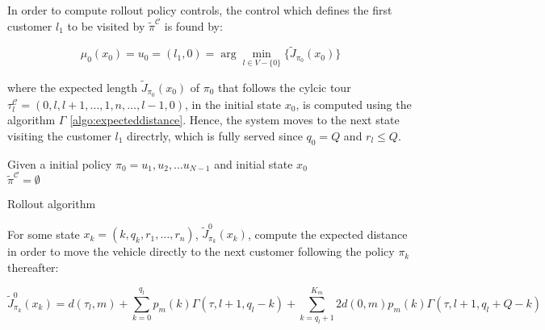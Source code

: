 

In order to compute rollout policy controls, the control which defines the first customer $l_1$ to be visited by $\tilde{\pi}^\mathcal{C}$ is found by:

\[\mu_0(x_0) = u_0 = (l_1,0) = \arg\min\limits_{l \in V-\{0\}} \{\tilde{J}_{\pi_0}(x_0)\}\]

where the expected length $\tilde{J}_{\pi_0}(x_0)$ of ${\pi_0}$ that follows the cylcic tour $\tau^\mathcal{C}_l=(0,l,l+1,\ldots,1,n,\ldots,l-1,0)$, in the initial state $x_0$, is computed using the algorithm $\Gamma$ \ref{algo:expecteddistance}. Hence, the system moves to the next state visiting the customer $l_1$ directrly, which is fully served since $q_0 = Q$ and $r_l \leq Q$.


 
\begin{algorithm}
Given a initial policy $\pi_0=u_1,u_2,\ldots u_{N-1}$ and initial state $x_0$ \\
$\tilde{\pi}^\mathcal{C} = \emptyset$\\
\caption{Rollout algorithm}\label{algo:rollout}
\end{algorithm}


For some state $x_k = (k,q_k,r_1,\ldots,r_n)$, $\tilde{J}^0_{\pi_k}(x_k)$, compute the expected distance in order to move the vehicle directly to the next customer following the policy ${\pi_k}$ thereafter:

\begin{equation}\label{ra:Cost2Go0}%
 \tilde{J}^0_{\pi_k}(x_k)=d(\tau_l,m)+\sum_{k=0}^{q_l}p_m(k)\Gamma(\tau,l+1,q_l-k)+\sum_{k=q_l+1}^{K_m}2d(0,m)p_m(k)\Gamma(\tau,l+1,q_l+Q-k)%
\end{equation}

